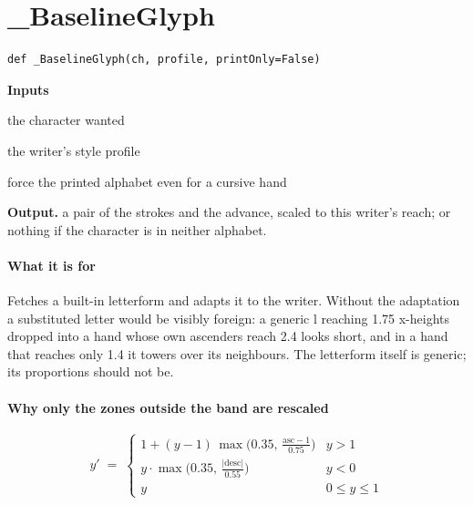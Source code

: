 \section{\_BaselineGlyph}
\begin{lstlisting}[style=sig]
def _BaselineGlyph(ch, profile, printOnly=False)
\end{lstlisting}

\noindent\textbf{Inputs}
\begin{description}[leftmargin=2.2em,style=nextline,font=\normalfont\ttfamily]\setlength\itemsep{1pt}
  \item[{ch}] \normalfont the character wanted
  \item[{profile}] \normalfont the writer's style profile
  \item[{printOnly}] \normalfont force the printed alphabet even for a cursive hand
\end{description}

\noindent\textbf{Output.} a pair of the strokes and the advance, scaled to this writer's reach; or nothing if the character is in neither alphabet.


\paragraph{What it is for}
Fetches a built-in letterform and adapts it to the writer. Without the adaptation a substituted letter would be visibly foreign: a generic l reaching 1.75 x-heights dropped into a hand whose own ascenders reach 2.4 looks short, and in a hand that reaches only 1.4 it towers over its neighbours. The letterform itself is generic; its proportions should not be.


\paragraph{Why only the zones outside the band are rescaled}

\begin{equation}
y' \;=\; \begin{cases} 1 + (y-1)\,\max\!\big(0.35,\, \tfrac{\mathrm{asc}-1}{0.75}\big) & y > 1 \\[4pt] y \cdot \max\!\big(0.35,\, \tfrac{|\mathrm{desc}|}{0.55}\big) & y < 0 \\[4pt] y & 0 \le y \le 1 \end{cases}
\end{equation}

